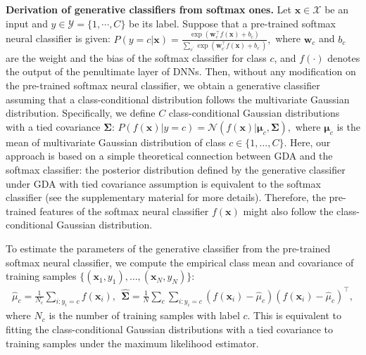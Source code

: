 \documentclass{article}
\begin{document}
{\bf Derivation of generative classifiers from softmax ones.}
Let $\mathbf{x}\in \mathcal{X}$ be an input and $y \in \mathcal{Y} = \{1,\cdots,C\}$ be its label.
Suppose that
a pre-trained softmax neural classifier is given:
$P\left(y=c|\mathbf{x}\right)
= \frac{  \exp \left( \mathbf{w}_c^\top f \left( \mathbf{x} \right) + b_c \right) }{\sum_{c^\prime} \exp \left( \mathbf{w}_{c^\prime}^\top f \left( \mathbf{x} \right)  + b_{c^\prime}\right) },$
where $\mathbf{w}_c$ and $b_c$ are the weight and the bias of the softmax classifier for class $c$, and $f(\cdot)$ denotes the output of the penultimate layer of DNNs.
Then, without any modification on the pre-trained softmax neural classifier,
we obtain a generative classifier assuming that a class-conditional distribution follows the multivariate Gaussian distribution.
Specifically, 
we define $C$ class-conditional Gaussian distributions with a tied covariance $\mathbf{\Sigma}$: 
$P\left( f(\mathbf{x})|y=c\right) = \mathcal{N} \left(f(\mathbf{x})| \mathbf{\mu}_c, \mathbf{\Sigma} \right),$
where $\mathbf{\mu}_c$ is the mean of multivariate Gaussian distribution of class $c \in \{1,...,C\}$.
Here, our approach is based on a simple theoretical connection between GDA and the softmax classifier: the posterior distribution defined by the generative classifier under GDA with tied covariance assumption is equivalent to the softmax classifier (see the supplementary material for more details).
Therefore, the pre-trained features of the softmax neural classifier $f(\mathbf{x})$ might also follow the class-conditional Gaussian distribution.

To estimate the parameters of the generative classifier from the pre-trained softmax neural classifier,
we compute the empirical class mean and covariance of training samples $\{(\mathbf{x}_1,y_1),\ldots, (\mathbf{x}_N,y_N)\}$:
\begin{align} \label{eq:empirical_mean}
{\widehat \mu}_c = \frac{1}{N_c} \sum_{i:y_i=c} f(\mathbf{x}_i), ~~\mathbf{\widehat \Sigma} = \frac{1}{N} \sum_c \sum_{i:y_i=c} \left(f(\mathbf{x}_i) - \widehat \mu_c\right) \left(f(\mathbf{x}_i) - \widehat \mu_c\right)^\top,
\end{align}
where $N_c$ is the number of training samples with label $c$.
This is equivalent to fitting the class-conditional Gaussian distributions with a tied covariance to training samples under the maximum likelihood estimator.
\end{document}
